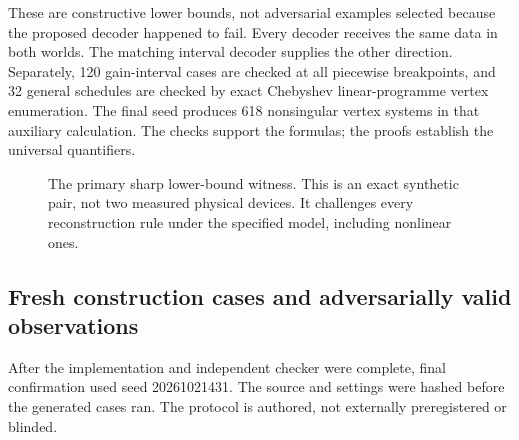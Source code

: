 \documentclass[11pt,letterpaper]{article}
\theoremstyle{definition}\newtheorem{definition}[theorem]{Definition}
\theoremstyle{remark}\newtheorem{remark}[theorem]{Remark}
\begin{document}
These are constructive lower bounds, not adversarial examples selected because the proposed decoder happened to fail. Every decoder receives the same data in both worlds. The matching interval decoder supplies the other direction. Separately, 120 gain-interval cases are checked at all piecewise breakpoints, and 32 general schedules are checked by exact Chebyshev linear-programme vertex enumeration. The final seed produces 618 nonsingular vertex systems in that auxiliary calculation. The checks support the formulas; the proofs establish the universal quantifiers.

\begin{figure}[htbp]\centering
{}
\caption{The primary sharp lower-bound witness. This is an exact synthetic pair, not two measured physical devices. It challenges every reconstruction rule under the specified model, including nonlinear ones.}
\label{fig:witness}
\end{figure}

\subsection{Fresh construction cases and adversarially valid observations}
After the implementation and independent checker were complete, final confirmation used seed 20261021431. The source and settings were hashed before the generated cases ran. The protocol is authored, not externally preregistered or blinded.
\end{document}
